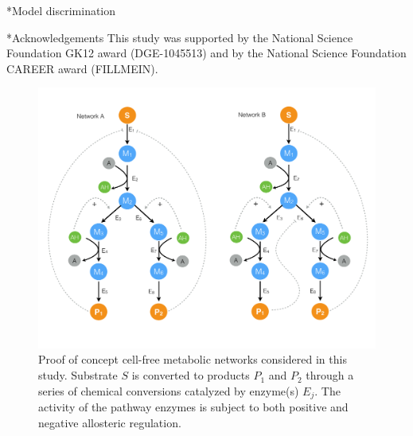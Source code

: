 \documentclass[12pt]{article}
\makeatletter
\renewcommand\subsection{\@startsection
	{subsection}{2}{0mm}
	{-0.05in}
	{-0.5\baselineskip}
	{\normalfont\normalsize\bfseries}}
\renewcommand\section{\@startsection
	{subsection}{2}{0mm}
	{-0.2in}
	{0.05\baselineskip}
	{\normalfont\large\bfseries}}
\makeatother
\begin{document}
\subsection*{Model discrimination}


\section*{Acknowledgements}
This study was supported by the National Science Foundation GK12 award (DGE-1045513) 
and by the National Science Foundation CAREER award (FILLMEIN).

\clearpage
%
%




\clearpage

\begin{figure}
\centering
\includegraphics[width=1.0\textwidth]{./figs/Figure-1-Networks.pdf}
\caption{Proof of concept cell-free metabolic networks considered in this study. Substrate $S$ is converted to products $P_{1}$ and $P_{2}$ through a series of chemical conversions
catalyzed by enzyme(s) $E_{j}$. The activity of the pathway enzymes is subject to both positive and negative allosteric regulation. }\label{fig-networks}
\end{figure}

\clearpage
\end{document}
